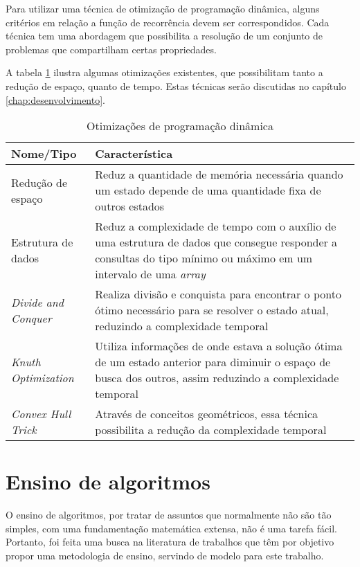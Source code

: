 Para utilizar uma técnica de otimização de programação dinâmica, alguns critérios em relação a função de recorrência devem ser correspondidos. Cada técnica tem uma abordagem que possibilita a resolução de um conjunto de problemas que compartilham certas propriedades.

A tabela \ref{tab:otimizacoes} ilustra algumas otimizações existentes, que possibilitam tanto a redução de espaço, quanto de tempo. Estas técnicas serão discutidas no capítulo \ref{chap:desenvolvimento}.

\begin{table}[H]
	\centering
	\caption[Otimizações de programação dinâmica]{Otimizações de programação dinâmica}
	\label{tab:otimizacoes}
	\begin{tabular}{p{4cm} | p{11cm}}
		\hline \SPACE
		\textbf{Nome/Tipo} & \textbf{Característica} \\ \hline \SPACE
		Redução de espaço &  Reduz a quantidade de memória necessária quando um estado depende de uma quantidade fixa de outros estados \\ \hline \SPACE
		Estrutura de dados &  Reduz a complexidade de tempo com o auxílio de uma estrutura de dados que consegue responder a consultas do tipo mínimo ou máximo em um intervalo de uma \textit{array}  \\ \hline \SPACE
		\textit{Divide and Conquer} & Realiza divisão e conquista para encontrar o ponto ótimo necessário para se resolver o estado atual, reduzindo a complexidade temporal \\ \hline \SPACE
		\textit{Knuth Optimization} & Utiliza informações de onde estava a solução ótima de um estado anterior para diminuir o espaço de busca dos outros, assim reduzindo a complexidade temporal  \\ \hline \SPACE
		\textit{Convex Hull Trick} & Através de conceitos geométricos, essa técnica possibilita a redução da complexidade temporal \\ \hline 
	\end{tabular}
	
\end{table}

\section{Ensino de algoritmos}
\label{sec:ensino}

O ensino de algoritmos, por tratar de assuntos que normalmente não são tão simples, com uma fundamentação matemática extensa, não é uma tarefa fácil. Portanto, foi feita uma busca na literatura de trabalhos que têm por objetivo propor uma metodologia de ensino, servindo de modelo para este trabalho.


